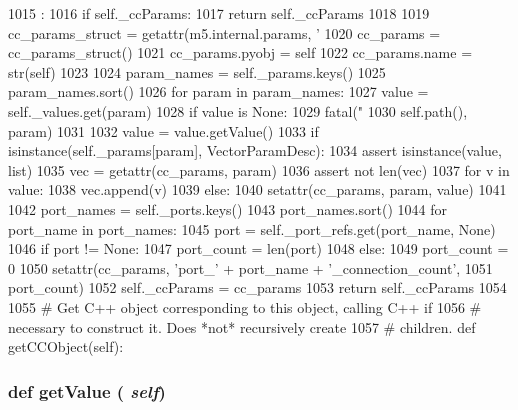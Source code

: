 \begin{DoxyCode}
1015                          :
1016         if self._ccParams:
1017             return self._ccParams
1018 
1019         cc_params_struct = getattr(m5.internal.params, '%
1020         cc_params = cc_params_struct()
1021         cc_params.pyobj = self
1022         cc_params.name = str(self)
1023 
1024         param_names = self._params.keys()
1025         param_names.sort()
1026         for param in param_names:
1027             value = self._values.get(param)
1028             if value is None:
1029                 fatal("%
1030                       self.path(), param)
1031 
1032             value = value.getValue()
1033             if isinstance(self._params[param], VectorParamDesc):
1034                 assert isinstance(value, list)
1035                 vec = getattr(cc_params, param)
1036                 assert not len(vec)
1037                 for v in value:
1038                     vec.append(v)
1039             else:
1040                 setattr(cc_params, param, value)
1041 
1042         port_names = self._ports.keys()
1043         port_names.sort()
1044         for port_name in port_names:
1045             port = self._port_refs.get(port_name, None)
1046             if port != None:
1047                 port_count = len(port)
1048             else:
1049                 port_count = 0
1050             setattr(cc_params, 'port_' + port_name + '_connection_count',
1051                     port_count)
1052         self._ccParams = cc_params
1053         return self._ccParams
1054 
1055     # Get C++ object corresponding to this object, calling C++ if
1056     # necessary to construct it.  Does *not* recursively create
1057     # children.
    def getCCObject(self):
\end{DoxyCode}
\hypertarget{classm5_1_1SimObject_1_1SimObject_acc340fbd4335fa34f9d57fb454b28ed0}{
\subsubsection[{getValue}]{\setlength{\rightskip}{0pt plus 5cm}def getValue ( {\em self})}}
\label{classm5_1_1SimObject_1_1SimObject_acc340fbd4335fa34f9d57fb454b28ed0}



